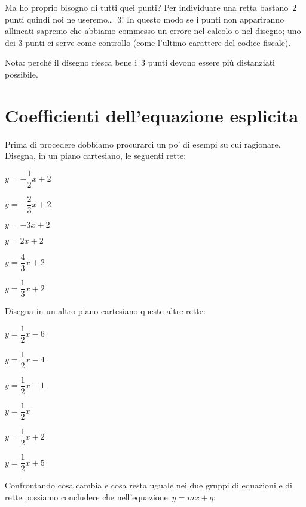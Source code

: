 Ma ho proprio bisogno di tutti quei punti? Per individuare una retta 
bastano~\(2\) punti quindi noi ne useremo\dots~\(3\)! In questo modo se 
i punti non appariranno allineati sapremo che abbiamo commesso un errore 
nel calcolo o nel disegno; uno dei \(3\) punti ci serve come controllo 
(come l'ultimo carattere del codice fiscale).

Nota: perché il disegno riesca bene i~\(3\) punti devono essere più 
distanziati possibile.

\section{Coefficienti dell'equazione esplicita}
\label{sec:retta_coefficienti}

Prima di procedere dobbiamo procurarci un po' di esempi su cui ragionare.
Disegna, in un piano cartesiano, le seguenti rette:

\begin{multicols}{3}
 \TabPositions{0.6cm}
 \begin{enumeratea}
 \item \(y=-\dfrac{1}{2}x + 2\)
 \item \(y=-\dfrac{2}{3}x + 2\)
 \item \(y=-{3}x + 2\)
 \item \(y={2}x + 2\)
 \item \(y=\dfrac{4}{3}x + 2\)
 \item \(y=\dfrac{1}{3}x + 2\)
 \end{enumeratea}
\end{multicols}

Disegna in un altro piano cartesiano queste altre rette:

\begin{multicols}{3}
 \TabPositions{0.6cm}
 \begin{enumeratea}
 \item \(y=\dfrac{1}{2}x - 6\)
 \item \(y=\dfrac{1}{2}x -4\)
 \item \(y=\dfrac{1}{2}x -1\)
 \item \(y=\dfrac{1}{2}x\)
 \item \(y=\dfrac{1}{2}x + 2\)
 \item \(y=\dfrac{1}{2}x + 5\)
 \end{enumeratea}
\end{multicols}

Confrontando cosa cambia e cosa resta uguale nei due gruppi di equazioni 
e di rette possiamo concludere che nell'equazione~\(y=mx+q\):


